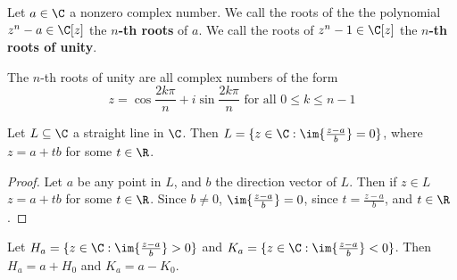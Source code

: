 \begin{definition}
    Let $a \in \C$ a nonzero complex number. We call the roots of the the
    polynomial $z^n-a \in \C[z]$ the \textbf{$n$-th roots} of $a$. We call the
    roots of  $z^n-1 \in \C[z]$ the \textbf{$n$-th roots of unity}.
\end{definition}

\begin{example}\label{example_1.2}
    The $n$-th roots of unity are all complex numbers of the form
    \begin{equation*}
        z=\cos{\frac{2k\pi}{n}}+i\sin{\frac{2k\pi}{n}} \text{ for all } 0 \leq k
        \leq n-1
    \end{equation*}
\end{example}

\begin{lemma}\label{1.2.5}
    Let $L \subseteq \C$ a straight line in  $\C$. Then  $L=\{z \in \C :
    \im{\frac{z-a}{b}}=0\}$, where $z=a+tb$ for some $t \in \R$.
\end{lemma}
\begin{proof}
    Let $a$ be any point in  $L$, and  $b$ the direction vector of  $L$. Then if
     $z \in L$  $z=a+tb$ for some  $t \in \R$. Since $b \neq 0$,
     $\im{\frac{z-a}{b}}=0$, since $t=\frac{z-a}{b}$, and $t \in \R$.
\end{proof}
\begin{corollary}
    Let $H_a=\{z \in \C : \im{\frac{z-a}{b}} > 0\}$ and $K_a=\{z \in \C :
    \im{\frac{z-a}{b}}<0\}$. Then $H_a=a+H_0$ and $K_a=a-K_0$.
\end{corollary}
